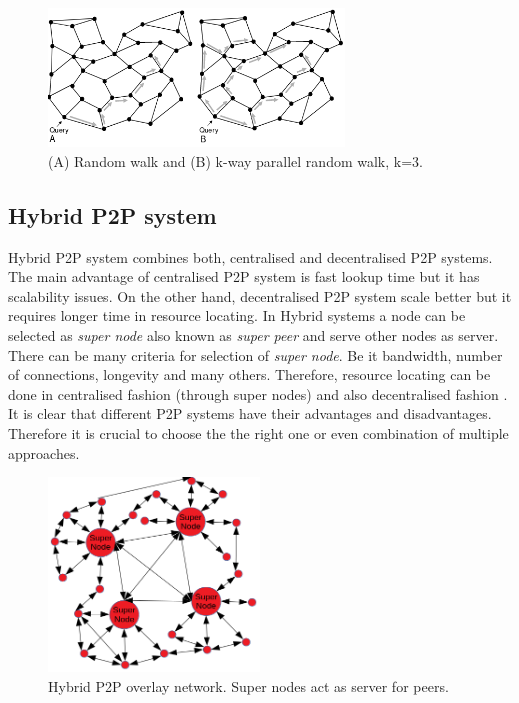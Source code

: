 \begin{figure}[ht]
	\centering
	\includegraphics[width=0.7\textwidth]{images/random-walk-graph.png}
	\caption{\label{fig:random-walk-graph}(A) Random walk and (B) k-way parallel random walk, k=3. \cite{koegel_buford_p2p_2009}}
\end{figure}

\subsection{Hybrid P2P system}
\quad Hybrid P2P system combines both, centralised and decentralised P2P systems. The main advantage of centralised P2P system is fast lookup time but it has scalability issues. On the other hand, decentralised P2P system scale better but it requires longer time in resource locating. In Hybrid systems a node can be selected as \textit{super node} also known as \textit{super peer} and serve other nodes as server. There can be many criteria for selection of \textit{super node}. Be it bandwidth, number of connections, longevity and many others. Therefore, resource locating can be done in centralised fashion (through super nodes) and also decentralised fashion \cite{vu_peer--peer_2010}. It is clear that different P2P systems have their advantages and disadvantages. Therefore it is crucial to choose the the right one or even combination of multiple approaches.

\begin{figure}[ht]
	\centering
	\includegraphics[width=0.5\textwidth]{images/hybrid-p2p.png}
	\caption{\label{fig:hybrid-p2p} Hybrid P2P overlay network. Super nodes act as server for peers.}
\end{figure}



